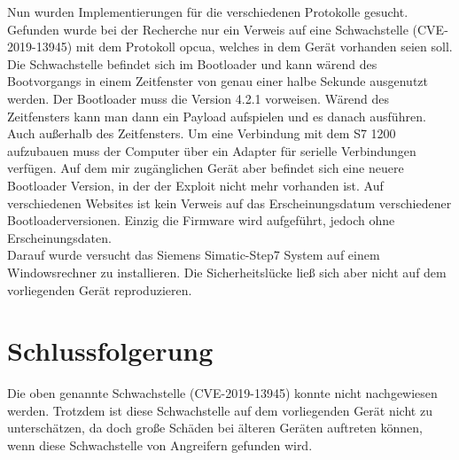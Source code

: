 \noindent Nun wurden Implementierungen für die verschiedenen Protokolle gesucht.
Gefunden wurde bei der Recherche nur ein Verweis auf eine Schwachstelle (CVE-2019-13945) mit dem Protokoll opcua, welches in dem Gerät vorhanden seien soll.
Die Schwachstelle befindet sich im Bootloader und kann wärend des Bootvorgangs in einem Zeitfenster von genau einer halbe Sekunde 
ausgenutzt werden. Der Bootloader muss die Version 4.2.1 vorweisen. Wärend des Zeitfensters kann man dann ein Payload aufspielen und es danach ausführen. 
Auch außerhalb des Zeitfensters. 
Um eine Verbindung mit dem S7 1200 aufzubauen muss der Computer über ein Adapter für serielle Verbindungen verfügen.
Auf dem mir zugänglichen Gerät aber befindet sich eine neuere Bootloader Version, in der der Exploit nicht mehr vorhanden ist.
Auf verschiedenen Websites ist kein Verweis auf das Erscheinungsdatum verschiedener Bootloaderversionen. Einzig die Firmware wird aufgeführt, 
jedoch ohne Erscheinungsdaten.\\
Darauf wurde versucht das Siemens Simatic-Step7 System auf einem Windowsrechner zu installieren. 
Die Sicherheitslücke ließ sich aber nicht auf dem vorliegenden Gerät reproduzieren.


  



\section{Schlussfolgerung}

Die oben genannte Schwachstelle (CVE-2019-13945) konnte nicht nachgewiesen werden. Trotzdem ist diese Schwachstelle auf dem vorliegenden Gerät nicht zu unterschätzen, da doch große Schäden bei älteren Geräten auftreten können, wenn diese Schwachstelle von Angreifern gefunden wird.


